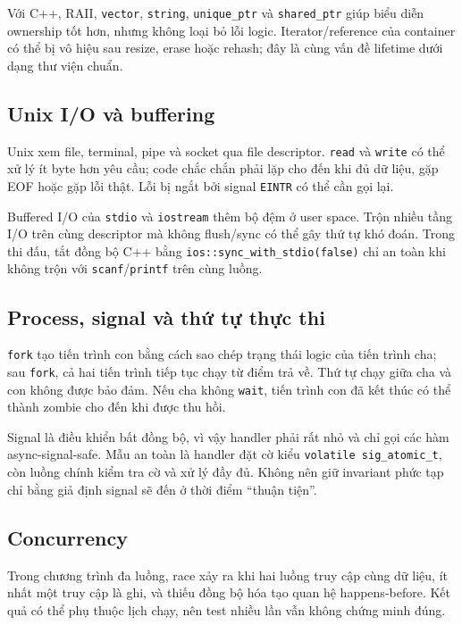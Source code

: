 \documentclass[11pt]{article}
\begin{document}
Với C++, RAII, \texttt{vector}, \texttt{string}, \texttt{unique\_ptr} và
\texttt{shared\_ptr} giúp biểu diễn ownership tốt hơn, nhưng không loại bỏ lỗi
logic. Iterator/reference của container có thể bị vô hiệu sau resize, erase
hoặc rehash; đây là cùng vấn đề lifetime dưới dạng thư viện chuẩn.

\subsection{Unix I/O và buffering}

Unix xem file, terminal, pipe và socket qua file descriptor. \texttt{read} và
\texttt{write} có thể xử lý ít byte hơn yêu cầu; code chắc chắn phải lặp cho
đến khi đủ dữ liệu, gặp EOF hoặc gặp lỗi thật. Lỗi bị ngắt bởi signal
\texttt{EINTR} có thể cần gọi lại.

Buffered I/O của \texttt{stdio} và \texttt{iostream} thêm bộ đệm ở user space.
Trộn nhiều tầng I/O trên cùng descriptor mà không flush/sync có thể gây thứ tự
khó đoán. Trong thi đấu, tắt đồng bộ C++ bằng
\texttt{ios::sync\_with\_stdio(false)} chỉ an toàn khi không trộn với
\texttt{scanf}/\texttt{printf} trên cùng luồng.

\subsection{Process, signal và thứ tự thực thi}

\texttt{fork} tạo tiến trình con bằng cách sao chép trạng thái logic của tiến
trình cha; sau \texttt{fork}, cả hai tiến trình tiếp tục chạy từ điểm trả về.
Thứ tự chạy giữa cha và con không được bảo đảm. Nếu cha không \texttt{wait},
tiến trình con đã kết thúc có thể thành zombie cho đến khi được thu hồi.

Signal là điều khiển bất đồng bộ, vì vậy handler phải rất nhỏ và chỉ gọi các
hàm async-signal-safe. Mẫu an toàn là handler đặt cờ kiểu
\texttt{volatile sig\_atomic\_t}, còn luồng chính kiểm tra cờ và xử lý đầy đủ.
Không nên giữ invariant phức tạp chỉ bằng giả định signal sẽ đến ở thời điểm
``thuận tiện''.

\subsection{Concurrency}

Trong chương trình đa luồng, race xảy ra khi hai luồng truy cập cùng dữ liệu,
ít nhất một truy cập là ghi, và thiếu đồng bộ hóa tạo quan hệ happens-before.
Kết quả có thể phụ thuộc lịch chạy, nên test nhiều lần vẫn không chứng minh
đúng.
\end{document}
